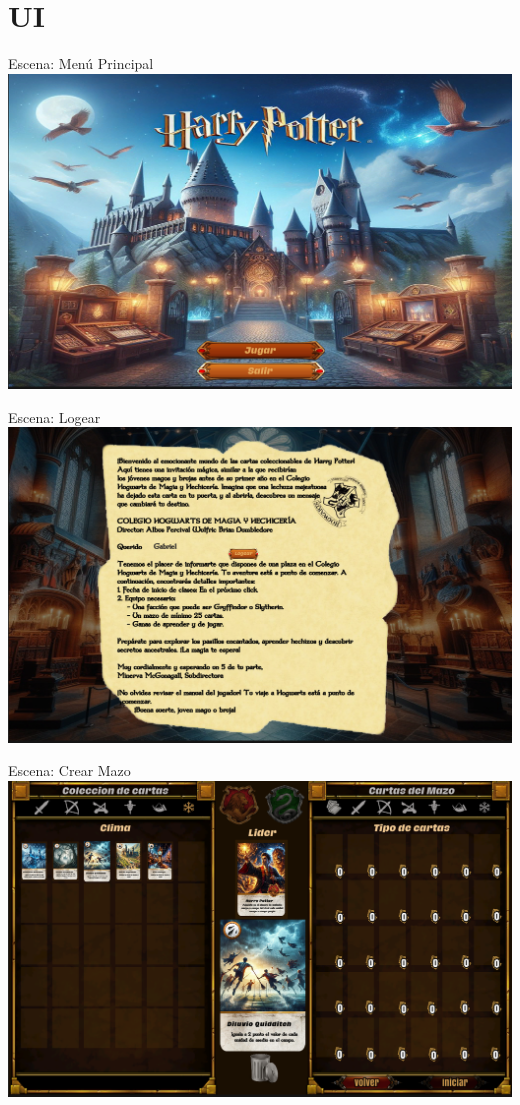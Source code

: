 \documentclass[a4paper, 12pt]{beamer}
\begin{document}
\section{UI}
\begin{frame}{\textcolor{plata}{Escena: Menú Principal}}
\includegraphics[scale = 0.2]{images/image1.png}
\end{frame}

\begin{frame}{\textcolor{plata}{Escena: Logear}}
\includegraphics[scale = 0.2]{images/image2.png}
\end{frame}

\begin{frame}{\textcolor{plata}{Escena: Crear Mazo}}
\includegraphics[scale = 0.2]{images/image3.png}
\end{frame}
\end{document}
